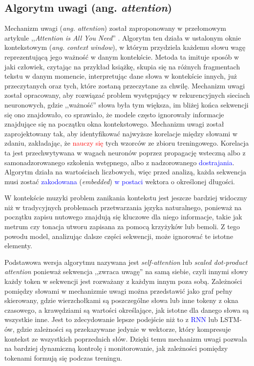 \documentclass[data-science]{agh-wi} %
\begin{document}
\subsection{Algorytm uwagi (ang. \textit{attention})}
\label{sec:attention}
Mechanizm uwagi (\textit{ang. attention}) został zaproponowany w przełomowym artykule ,,\textit{Attention is All You Need}'' \cite{attention}. Algorytm ten działa w ustalonym oknie kontekstowym (\textit{ang. context window}), w którym przydziela każdemu słowu wagę reprezentującą jego ważność w danym kontekście. Metoda ta imituje sposób w jaki człowiek, czytając na przykład książkę, skupia się na różnych fragmentach tekstu w danym momencie, interpretując dane słowa w kontekście innych, już przeczytanych oraz tych, które zostaną przeczytane za chwilę. Mechanizm uwagi został opracowany, aby rozwiązać problem występujący w rekurencyjnych sieciach neuronowych, gdzie ,,ważność'' słowa była tym większa, im bliżej końca sekwencji się ono znajdowało, co sprawiało, że modele często ignorowały informacje znajdujące się na początku okna kontekstowego. Mechanizm uwagi został zaprojektowany tak, aby identyfikować najwyższe korelacje między słowami w zdaniu, zakładając, że \textcolor{red}{nauczy się} tych wzorców ze zbioru treningowego. Korelacja ta jest przechwytywana w wagach neuronów poprzez propagację wsteczną albo z samonadzorowanego szkolenia wstępnego, albo z nadzorowanego \textcolor{blue}{dostrajania}. Algorytm działa na wartościach liczbowych, więc przed analizą, każda sekwencja musi zostać \textcolor{blue}{zakodowana} (\textit{embedded}) \textcolor{blue}{w postaci} wektora o określonej długości.

W kontekście muzyki problem zanikania kontekstu jest jeszcze bardziej widoczny niż w tradycyjnych problemach przetwarzania języka naturalnego, ponieważ na początku zapisu nutowego znajdują się kluczowe dla niego informacje, takie jak metrum czy tonacja utworu zapisana za pomocą krzyżyków lub bemoli. Z tego powodu model, analizując dalsze części sekwencji, może ignorować te istotne elementy.

Podstawowa wersja algorytmu nazywana jest \textit{self-attention} lub \textit{scaled dot-product attention} ponieważ sekwencja ,,zwraca uwagę'' na samą siebie, czyli innymi słowy każdy token w sekwencji jest rozważany z każdym innym poza sobą. Zależności pomiędzy słowami w mechanizmie uwagi można przedstawić jako graf pełny skierowany, gdzie wierzchołkami są poszczególne słowa lub inne tokeny z okna czasowego, a krawędziami są wartości określające, jak istotne dla danego słowa są wszystkie inne. Jest to zdecydowanie lepsze podejście niż to z \textcolor{blue}{RNN} lub LSTM-ów, gdzie zależności są przekazywane jedynie w wektorze, który kompresuje kontekst ze wszystkich poprzednich słów. Dzięki temu mechanizm uwagi pozwala na bardziej dynamiczną kontrolę i monitorowanie, jak zależności pomiędzy tokenami formują się podczas treningu.
\end{document}
